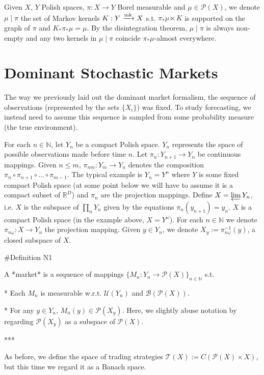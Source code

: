 \documentclass[a4paper]{article}
\newcommand{\Nats}{\mathbb{N}}
\newcommand{\Reals}{\mathbb{R}}
\newcommand{\Markov}{\xrightarrow{\textnormal{mk}}}
\newcommand{\Prob}{\mathcal{P}}
\newcommand{\T}{\mathcal{T}}
\newcommand{\B}{\mathcal{B}}
\newcommand{\UM}{\mathcal{U}}
\begin{document}
Given ${X}$, ${Y}$ Polish spaces, ${\pi: X \rightarrow Y}$ Borel measurable and ${\mu \in \Prob(X)}$, we denote ${\mu \mid \pi}$ the set of Markov kernels ${K: Y \Markov X}$ s.t. ${\pi_* \mu \ltimes K}$ is supported on the graph of ${\pi}$ and ${K_*\pi_* \mu = \mu}$. By the disintegration theorem, ${\mu \mid \pi}$ is always non-empty and any two kernels in ${\mu \mid \pi}$ coincide ${\pi_*\mu}$-almost everywhere.

\section{Dominant Stochastic Markets}

The way we previously laid out the dominant market formalism, the sequence of observations (represented by the sets $\{X_i\}$) was fixed. To study forecasting, we instead need to assume this sequence is sampled from some probability measure (the true environment).

For each ${n \in \Nats}$, let ${Y_n}$ be a compact Polish space. ${Y_n}$ represents the space of possible observations made before time ${n}$. Let ${\pi_n: Y_{n+1} \rightarrow Y_n}$ be continuous mappings. Given ${n \leq m}$, ${\pi_{nm}: Y_m \rightarrow Y_n}$ denotes the composition $\pi_n \circ \pi_{n+1} \circ \ldots \circ \pi_{m-1}$. The typical example is ${Y_n=Y^n}$ where ${Y}$ is some fixed compact Polish space (at some point below we will have to assume it is a compact subset of ${\Reals^D}$) and ${\pi_n}$ are the projection mappings. Define ${X = \varprojlim Y_n}$, i.e. ${X}$ is the subspace of ${\prod_n Y_n}$ given by the equations ${\pi_n(y_{n+1})=y_n}$. ${X}$ is a compact Polish space (in the example above, ${X = Y^\omega}$). For each ${n \in \Nats}$ we denote ${\pi_{n\omega}: X \rightarrow Y_n}$ the projection mapping. Given ${y \in Y_n}$, we denote ${X_y:=\pi_{n\omega}^{-1}(y)}$, a closed subspace of ${X}$.

\#Definition N1

A *market* is a sequence of mappings ${\{M_n: Y_n \rightarrow \Prob(X)\}}_{n \in \Nats}$ s.t.

* Each ${M_n}$ is measurable w.r.t. ${\UM(Y_n)}$ and ${\B(\Prob(X))}$.

* For any ${y \in Y_n}$, ${M_n(y) \in \Prob(X_y)}$. Here, we slightly abuse notation by regarding ${\Prob(X_y)}$ as a subspace of ${\Prob(X)}$.

***

As before, we define the space of trading strategies ${\T(X):=C(\Prob(X)\times X)}$, but this time we regard it as a Banach space. 
\end{document}
